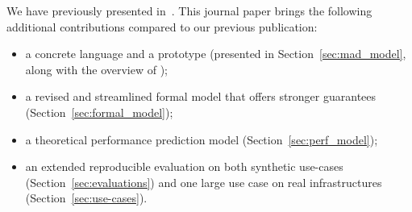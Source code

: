 We have previously presented \mad in~\cite{chardet:hal-01858150}. This
journal paper brings the following additional contributions compared
to our previous publication:
\begin{itemize}
\item a concrete language and a prototype (presented in
  Section~\ref{sec:mad_model}, along with the overview of \mad);
\item a revised and streamlined formal model that offers stronger
  guarantees (Section~\ref{sec:formal_model});
\item a theoretical performance prediction model
  (Section~\ref{sec:perf_model});
\item an extended reproducible evaluation on both synthetic use-cases
  (Section~\ref{sec:evaluations}) and one large use case on real
  infrastructures (Section~\ref{sec:use-cases}).
\end{itemize}





